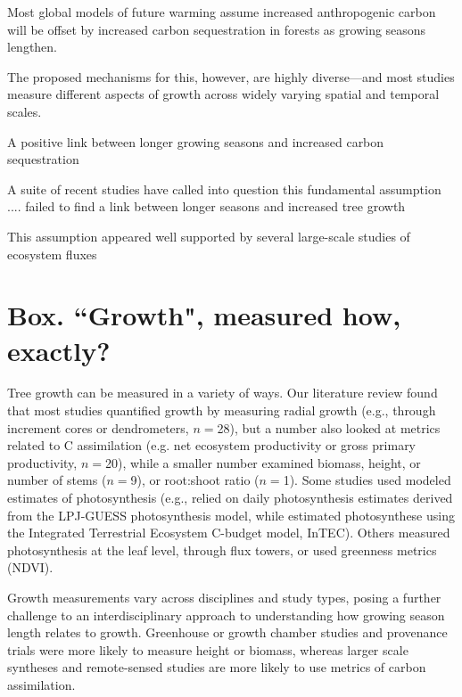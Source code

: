 \documentclass[11pt]{article}
\begin{document}
Most global models of future warming assume increased anthropogenic carbon will be offset by increased carbon sequestration in forests as growing seasons lengthen.

The proposed mechanisms for this, however, are highly diverse---and most studies measure different aspects of growth across widely varying spatial and temporal scales. 

A positive link between longer growing seasons and increased carbon sequestration 

A suite of recent studies have called into question this fundamental assumption .... failed to find a link between longer seasons and increased tree growth

This assumption appeared well supported by several large-scale studies of ecosystem fluxes 
\fi


\newpage
\section{Box. ``Growth", measured how, exactly?}
Tree growth can be measured in a variety of ways. Our literature review found that most studies quantified growth by measuring radial growth (e.g., through increment cores or dendrometers, $n=$28), but a number also looked at metrics related to C assimilation (e.g. net ecosystem productivity or gross primary productivity, $n=$20), while a smaller number examined biomass, height, or number of stems ($n=$9), or root:shoot ratio ($n=$1). Some studies used modeled estimates of photosynthesis 
(e.g., \citet{smith2014implications} relied on daily photosynthesis estimates derived from the LPJ-GUESS photosynthesis model, while \citet{chen2000approaches} estimated photosynthese using the Integrated Terrestrial Ecosystem C-budget model, InTEC). Others measured photosynthesis at the leaf level, through flux towers, or used greenness metrics (NDVI). 

Growth measurements vary across disciplines and study types, posing a further challenge to an interdisciplinary approach to understanding how growing season length relates to growth. Greenhouse or growth chamber studies and provenance trials were more likely to measure height or biomass, whereas larger scale syntheses and remote-sensed studies are more likely to use metrics of carbon assimilation. 
\end{document}
